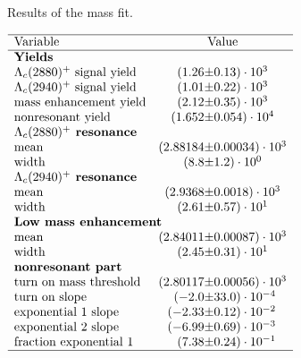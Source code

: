  
\begin{table}[h]
    \centering
    \caption{Results of the \Dz\proton mass fit.}
    \label{tab:fit_mD0p_RS}
    $\begin{array}{lr@{\pm}l}
    \hline
    \text{Variable} & \multicolumn{2}{c}{\text{Value}} \\
    \hline
        \multicolumn{3}{l}{\text{\textbf{Yields}}} \\
\text{\LcResI signal yield}&(1.26 & 0.13) \cdot 10^{3}\\
\text{\LcResII signal yield}&(1.01 & 0.22) \cdot 10^{3}\\
\text{mass enhancement yield}&(2.12 & 0.35) \cdot 10^{3}\\
\text{nonresonant yield}&(1.652 & 0.054) \cdot 10^{4}\\
\multicolumn{3}{l}{\text{\textbf{\LcResI resonance}}} \\
\text{mean}&(2.88184 & 0.00034) \cdot 10^{3}\\
\text{width}&(8.8 & 1.2) \cdot 10^{0}\\
\multicolumn{3}{l}{\text{\textbf{\LcResII resonance}}} \\
\text{mean}&(2.9368 & 0.0018) \cdot 10^{3}\\
\text{width}&(2.61 & 0.57) \cdot 10^{1}\\
\multicolumn{3}{l}{\text{\textbf{Low mass enhancement}}} \\
\text{mean}&(2.84011 & 0.00087) \cdot 10^{3}\\
\text{width}&(2.45 & 0.31) \cdot 10^{1}\\
\multicolumn{3}{l}{\text{\textbf{nonresonant part}}} \\
\text{turn on mass threshold}&(2.80117 & 0.00056) \cdot 10^{3}\\
\text{turn on slope}&(-2.0 & 33.0) \cdot 10^{-4}\\
\text{exponential 1 slope}&(-2.33 & 0.12) \cdot 10^{-2}\\
\text{exponential 2 slope}&(-6.99 & 0.69) \cdot 10^{-3}\\
\text{fraction exponential 1}&(7.38 & 0.24) \cdot 10^{-1}\\

\hline
\end{array}$
\end{table}
    